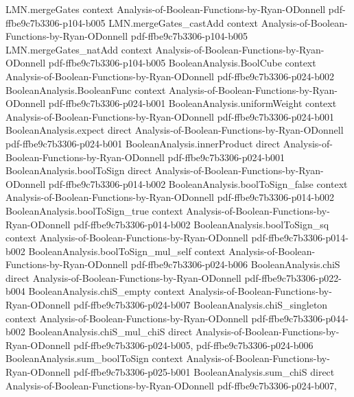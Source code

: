 \begin{lemma}
\proofstep
  {LMN.mergeGates}
  {context}
  {Analysis-of-Boolean-Functions-by-Ryan-ODonnell}
  {pdf-ffbe9c7b3306-p104-b005}
\proofstep
  {LMN.mergeGates_castAdd}
  {context}
  {Analysis-of-Boolean-Functions-by-Ryan-ODonnell}
  {pdf-ffbe9c7b3306-p104-b005}
\proofstep
  {LMN.mergeGates_natAdd}
  {context}
  {Analysis-of-Boolean-Functions-by-Ryan-ODonnell}
  {pdf-ffbe9c7b3306-p104-b005}
\proofstep
  {BooleanAnalysis.BoolCube}
  {context}
  {Analysis-of-Boolean-Functions-by-Ryan-ODonnell}
  {pdf-ffbe9c7b3306-p024-b002}
\proofstep
  {BooleanAnalysis.BooleanFunc}
  {context}
  {Analysis-of-Boolean-Functions-by-Ryan-ODonnell}
  {pdf-ffbe9c7b3306-p024-b001}
\proofstep
  {BooleanAnalysis.uniformWeight}
  {context}
  {Analysis-of-Boolean-Functions-by-Ryan-ODonnell}
  {pdf-ffbe9c7b3306-p024-b001}
\proofstep
  {BooleanAnalysis.expect}
  {direct}
  {Analysis-of-Boolean-Functions-by-Ryan-ODonnell}
  {pdf-ffbe9c7b3306-p024-b001}
\proofstep
  {BooleanAnalysis.innerProduct}
  {direct}
  {Analysis-of-Boolean-Functions-by-Ryan-ODonnell}
  {pdf-ffbe9c7b3306-p024-b001}
\proofstep
  {BooleanAnalysis.boolToSign}
  {direct}
  {Analysis-of-Boolean-Functions-by-Ryan-ODonnell}
  {pdf-ffbe9c7b3306-p014-b002}
\proofstep
  {BooleanAnalysis.boolToSign_false}
  {context}
  {Analysis-of-Boolean-Functions-by-Ryan-ODonnell}
  {pdf-ffbe9c7b3306-p014-b002}
\proofstep
  {BooleanAnalysis.boolToSign_true}
  {context}
  {Analysis-of-Boolean-Functions-by-Ryan-ODonnell}
  {pdf-ffbe9c7b3306-p014-b002}
\proofstep
  {BooleanAnalysis.boolToSign_sq}
  {context}
  {Analysis-of-Boolean-Functions-by-Ryan-ODonnell}
  {pdf-ffbe9c7b3306-p014-b002}
\proofstep
  {BooleanAnalysis.boolToSign_mul_self}
  {context}
  {Analysis-of-Boolean-Functions-by-Ryan-ODonnell}
  {pdf-ffbe9c7b3306-p024-b006}
\proofstep
  {BooleanAnalysis.chiS}
  {direct}
  {Analysis-of-Boolean-Functions-by-Ryan-ODonnell}
  {pdf-ffbe9c7b3306-p022-b004}
\proofstep
  {BooleanAnalysis.chiS_empty}
  {context}
  {Analysis-of-Boolean-Functions-by-Ryan-ODonnell}
  {pdf-ffbe9c7b3306-p024-b007}
\proofstep
  {BooleanAnalysis.chiS_singleton}
  {context}
  {Analysis-of-Boolean-Functions-by-Ryan-ODonnell}
  {pdf-ffbe9c7b3306-p044-b002}
\proofstep
  {BooleanAnalysis.chiS_mul_chiS}
  {direct}
  {Analysis-of-Boolean-Functions-by-Ryan-ODonnell}
  {pdf-ffbe9c7b3306-p024-b005,
    pdf-ffbe9c7b3306-p024-b006}
\proofstep
  {BooleanAnalysis.sum_boolToSign}
  {context}
  {Analysis-of-Boolean-Functions-by-Ryan-ODonnell}
  {pdf-ffbe9c7b3306-p025-b001}
\proofstep
  {BooleanAnalysis.sum_chiS}
  {direct}
  {Analysis-of-Boolean-Functions-by-Ryan-ODonnell}
  {pdf-ffbe9c7b3306-p024-b007,
}
\end{lemma}
